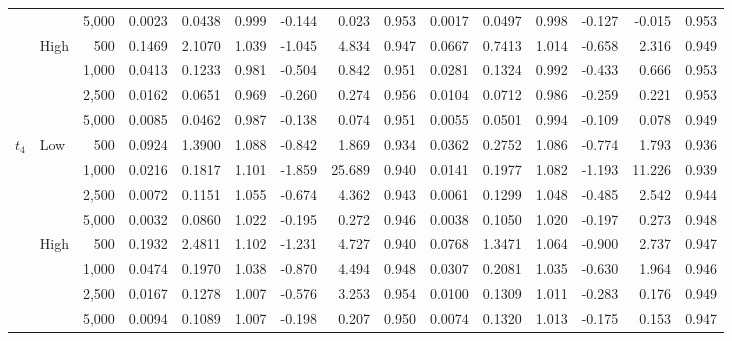 \begin{table}
\begin{tabular}{llr*{12}{r}}
 &  & 5,000 & 0.0023 & 0.0438 & 0.999 & -0.144 & 0.023 & 0.953 & 0.0017 & 0.0497 & 0.998 & -0.127 & -0.015 & 0.953\\
\addlinespace[1pt]
 & High & 500 & 0.1469 & 2.1070 & 1.039 & -1.045 & 4.834 & 0.947 & 0.0667 & 0.7413 & 1.014 & -0.658 & 2.316 & 0.949\\
 &  & 1,000 & 0.0413 & 0.1233 & 0.981 & -0.504 & 0.842 & 0.951 & 0.0281 & 0.1324 & 0.992 & -0.433 & 0.666 & 0.953\\
 &  & 2,500 & 0.0162 & 0.0651 & 0.969 & -0.260 & 0.274 & 0.956 & 0.0104 & 0.0712 & 0.986 & -0.259 & 0.221 & 0.953\\
 &  & 5,000 & 0.0085 & 0.0462 & 0.987 & -0.138 & 0.074 & 0.951 & 0.0055 & 0.0501 & 0.994 & -0.109 & 0.078 & 0.949\\
\addlinespace[3pt]
$t_4$ & Low & 500 & 0.0924 & 1.3900 & 1.088 & -0.842 & 1.869 & 0.934 & 0.0362 & 0.2752 & 1.086 & -0.774 & 1.793 & 0.936\\
 &  & 1,000 & 0.0216 & 0.1817 & 1.101 & -1.859 & 25.689 & 0.940 & 0.0141 & 0.1977 & 1.082 & -1.193 & 11.226 & 0.939\\
 &  & 2,500 & 0.0072 & 0.1151 & 1.055 & -0.674 & 4.362 & 0.943 & 0.0061 & 0.1299 & 1.048 & -0.485 & 2.542 & 0.944\\
 &  & 5,000 & 0.0032 & 0.0860 & 1.022 & -0.195 & 0.272 & 0.946 & 0.0038 & 0.1050 & 1.020 & -0.197 & 0.273 & 0.948\\
\addlinespace[1pt]
 & High & 500 & 0.1932 & 2.4811 & 1.102 & -1.231 & 4.727 & 0.940 & 0.0768 & 1.3471 & 1.064 & -0.900 & 2.737 & 0.947\\
 &  & 1,000 & 0.0474 & 0.1970 & 1.038 & -0.870 & 4.494 & 0.948 & 0.0307 & 0.2081 & 1.035 & -0.630 & 1.964 & 0.946\\
 &  & 2,500 & 0.0167 & 0.1278 & 1.007 & -0.576 & 3.253 & 0.954 & 0.0100 & 0.1309 & 1.011 & -0.283 & 0.176 & 0.949\\
 &  & 5,000 & 0.0094 & 0.1089 & 1.007 & -0.198 & 0.207 & 0.950 & 0.0074 & 0.1320 & 1.013 & -0.175 & 0.153 & 0.947\\
\bottomrule
\end{tabular}
\begin{minipage}{0.98\textheight}\small\vspace{4pt}

\end{minipage}
\end{table}
